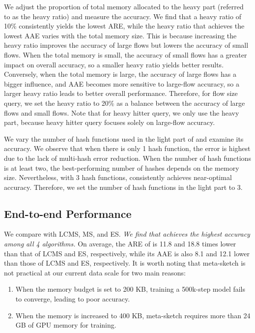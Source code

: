 %
We adjust the proportion of total memory allocated to the heavy part (referred to as the heavy ratio) and measure the accuracy. We find that a heavy ratio of 10\% consistently yields the lowest ARE, while the heavy ratio that achieves the lowest AAE varies with the total memory size. This is because increasing the heavy ratio improves the accuracy of large flows but lowers the accuracy of small flows.
When the total memory is small, the accuracy of small flows has a greater impact on overall accuracy, so a smaller heavy ratio yields better results. Conversely, when the total memory is large, the accuracy of large flows has a bigger influence, and AAE becomes more sensitive to large-flow accuracy, so a larger heavy ratio leads to better overall performance.
%
Therefore, for flow size query, we set the heavy ratio to 20\% as a balance between the accuracy of large flows and small flows.
%
Note that for heavy hitter query, we only use the heavy part, because heavy hitter query focuses solely on large-flow accuracy.




%
We vary the number of hash functions used in the light part of \alg{} and examine its accuracy. We observe that when there is only 1 hash function, the error is highest due to the lack of multi-hash error reduction. When the number of hash functions is at least two, the best-performing number of hashes depends on the memory size. Nevertheless, with 3 hash functions, \alg{} consistently achieves near-optimal accuracy.
Therefore, we set the number of hash functions in the light part to 3.




\subsection{End-to-end Performance}








%
We compare \alg{} with LCMS, MS, and ES. \textit{We find that \alg{} achieves the highest accuracy among all 4 algorithms.} On average, the ARE of \alg{} is 11.8 and 18.8 times lower than that of LCMS and ES, respectively, while its AAE is also 8.1 and 12.1 lower than those of LCMS and ES, respectively.
%
It is worth noting that meta-sketch is not practical at our current data scale for two main reasons:
%
\begin{enumerate}[leftmargin=*]
    \item When the memory budget is set to 200 KB, training a 500k-step model fails to converge, leading to poor accuracy.

    \item When the memory is increased to 400 KB, meta-sketch requires more than 24 GB of GPU memory for training.
\end{enumerate}




